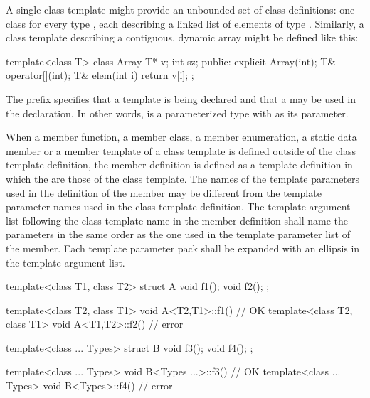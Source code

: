 \pnum
\begin{example}
A single class template
might provide an unbounded set of class definitions:
one class  for every type ,
each describing a linked list of elements of type .
Similarly, a class template  describing a contiguous,
dynamic array might be defined like this:
\begin{codeblock}
template<class T> class Array {
  T* v;
  int sz;
public:
  explicit Array(int);
  T& operator[](int);
  T& elem(int i) { return v[i]; }
};
\end{codeblock}
The prefix 
specifies that a template is being declared and that a
may be used in the declaration.
In other words,
is a parameterized type with
as its parameter.
\end{example}

\pnum
When a member function, a member class, a member enumeration, a static data member or
a member template of a class
template is defined outside of the class template definition,
the member definition is defined as a template definition in which the
are those of the class template.
The names of the template parameters used in the definition of the member may
be different from the template parameter names used in the class
template definition.
The template argument list following the class template name in the member
definition shall name the parameters in the same order as the one used in
the template parameter list of the member. Each template
parameter pack shall be expanded with an ellipsis in the template
argument list.
\begin{example}

\begin{codeblock}
template<class T1, class T2> struct A {
  void f1();
  void f2();
};

template<class T2, class T1> void A<T2,T1>::f1() { }    // OK
template<class T2, class T1> void A<T1,T2>::f2() { }    // error
\end{codeblock}

\begin{codeblock}
template<class ... Types> struct B {
  void f3();
  void f4();
};

template<class ... Types> void B<Types ...>::f3() { }    // OK
template<class ... Types> void B<Types>::f4() { }        // error
\end{codeblock}

\end{example}

